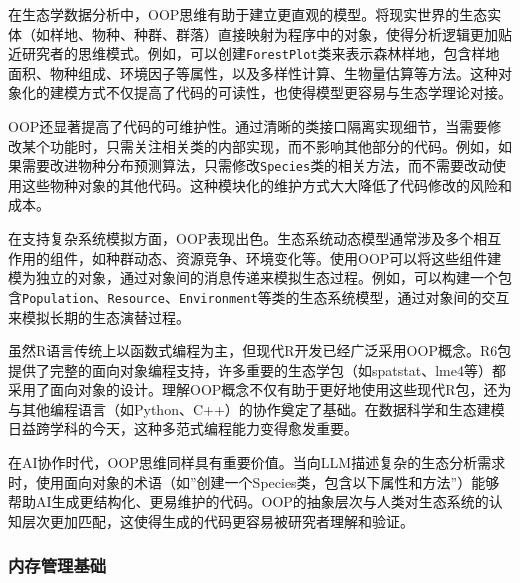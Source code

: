\documentclass[
  twoside]{book}
\begin{document}
在生态学数据分析中，OOP思维有助于建立更直观的模型。将现实世界的生态实体（如样地、物种、种群、群落）直接映射为程序中的对象，使得分析逻辑更加贴近研究者的思维模式。例如，可以创建\texttt{ForestPlot}类来表示森林样地，包含样地面积、物种组成、环境因子等属性，以及多样性计算、生物量估算等方法。这种对象化的建模方式不仅提高了代码的可读性，也使得模型更容易与生态学理论对接。

OOP还显著提高了代码的可维护性。通过清晰的类接口隔离实现细节，当需要修改某个功能时，只需关注相关类的内部实现，而不影响其他部分的代码。例如，如果需要改进物种分布预测算法，只需修改\texttt{Species}类的相关方法，而不需要改动使用这些物种对象的其他代码。这种模块化的维护方式大大降低了代码修改的风险和成本。

在支持复杂系统模拟方面，OOP表现出色。生态系统动态模型通常涉及多个相互作用的组件，如种群动态、资源竞争、环境变化等。使用OOP可以将这些组件建模为独立的对象，通过对象间的消息传递来模拟生态过程。例如，可以构建一个包含\texttt{Population}、\texttt{Resource}、\texttt{Environment}等类的生态系统模型，通过对象间的交互来模拟长期的生态演替过程。

虽然R语言传统上以函数式编程为主，但现代R开发已经广泛采用OOP概念。R6包提供了完整的面向对象编程支持，许多重要的生态学包（如spatstat、lme4等）都采用了面向对象的设计。理解OOP概念不仅有助于更好地使用这些现代R包，还为与其他编程语言（如Python、C++）的协作奠定了基础。在数据科学和生态建模日益跨学科的今天，这种多范式编程能力变得愈发重要。

在AI协作时代，OOP思维同样具有重要价值。当向LLM描述复杂的生态分析需求时，使用面向对象的术语（如''创建一个Species类，包含以下属性和方法''）能够帮助AI生成更结构化、更易维护的代码。OOP的抽象层次与人类对生态系统的认知层次更加匹配，这使得生成的代码更容易被研究者理解和验证。

\hypertarget{ux5185ux5b58ux7ba1ux7406ux57faux7840}{%
\subsubsection{内存管理基础}\label{ux5185ux5b58ux7ba1ux7406ux57faux7840}}
\end{document}
